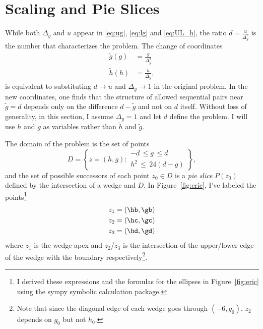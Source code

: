 \documentclass[twocolumn]{article}
\begin{document}
\section{Scaling and Pie Slices}
\label{sec:scaling}

While both $\Delta_y$ and $u$ appear in \eqref{eq:ug}, \eqref{eq:lg}
and \eqref{eq:UL_h}, the ratio $d = \frac{u}{\Delta_y^2}$ is the
number that characterizes the problem.  The change of coordinates
\begin{subequations}
  \label{eq:rescale}
  \begin{align}
    \tilde g(g) &= \frac{g}{\Delta_y^2} \\
    \tilde h(h) &= \frac{h}{\Delta_y},
  \end{align}
\end{subequations}
is equivalent to substituting $d \rightarrow u$ and
$\Delta_y \rightarrow 1$ in the original problem.  In the new
coordinates, one finds that the structure of allowed sequential pairs
near $\tilde g=d$ depends only on the difference $d-\tilde g$ and not
on $d$ itself.  Without loss of generality, in this section, I assume
$\Delta_y=1$ and let $d$ define the problem.  I will use $h$ and $g$
as variables rather than $\tilde h$ and $\tilde g$.

The domain of the problem is the set of points
\begin{equation}
  \label{eq:domain}
  D = \left\{ z = (h,g) :
    \begin{array}{l}
      -d \, \leq g \, \leq d \\
      h^2\, \leq \, 24(d-g)
    \end{array}
    \right\},
\end{equation}
and the set of possible successors of each point $z_0 \in D$ is a
\emph{pie slice} $P(z_0)$ defined by the intersection of a wedge and
$D$.  In Figure~\ref{fig:eric}, I've labeled the points\footnote{I
  derived these expressions and the formulas for the ellipses in
  Figure~\ref{fig:eric} using the sympy symbolic calculation package.}
\begin{align*}
  z_1 &= \left( \hb, \gb \right) \\
  z_2 &= \left( \hc, \gc \right) \\
  z_3 &= \left( \hd, \gd \right)
\end{align*}
where $z_1$ is the wedge apex and $z_2$/$z_3$ is the intersection of
the upper/lower edge of the wedge with the boundary
respectively\footnote{Note that since the diagonal edge of each wedge
  goes through $(-6,g_0)$, $z_2$ depends on $g_0$ but not $h_0$.}.
\end{document}

